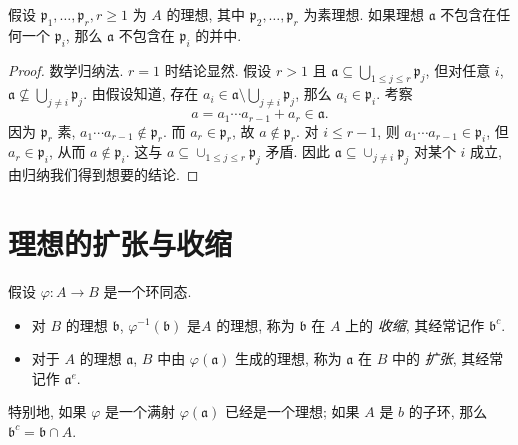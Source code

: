\begin{proposition}[素避]
  假设 \( \mathfrak{p}_1, \ldots, \mathfrak{p}_r, r \geq 1 \) 为 \( A \) 的理想,
  其中 \( \mathfrak{p}_2, \ldots, \mathfrak{p}_r \) 为素理想. 如果理想 \(
  \mathfrak{a} \) 不包含在任何一个 \( \mathfrak{p}_i \), 那么 \( \mathfrak{a} \)
  不包含在 \( \mathfrak{p}_i \) 的并中.
\end{proposition}
\begin{proof}
  数学归纳法. \( r = 1 \) 时结论显然. 假设 \( r > 1 \) 且 \( \mathfrak{a}
  \subseteq \bigcup_{1 \leq j \leq r} \mathfrak{p}_j \), 但对任意 \( i \), \(
  \mathfrak{a} \not\subseteq \bigcup_{j \neq i}\mathfrak{p}_j \). 由假设知道,
  存在 \( a_i \in \mathfrak{a} \setminus \bigcup_{j \neq i} \mathfrak{p}_j \),
  那么 \( a_i \in \mathfrak{p}_i \). 考察
  \[
    a = a_1 \cdots a_{r - 1} + a_r \in \mathfrak{a}.
  \]
  因为 \( \mathfrak{p}_r \) 素, \( a_1 \cdots a_{r - 1} \notin \mathfrak{p}_r
  \). 而 \( a_{r} \in \mathfrak{p}_r \), 故 \( a \notin \mathfrak{p}_r \).
  对 \( i \leq r - 1 \), 则 \( a_1 \cdots a_{r - 1} \in \mathfrak{p}_{i} \), 但
  \( a_r \in \mathfrak{p}_i \), 从而 \( a \notin \mathfrak{p}_i \). 这与 \( a
  \subseteq \cup_{1 \leq j \leq r} \mathfrak{p}_j \) 矛盾. 因此 \( \mathfrak{a}
  \subseteq \cup_{j \neq i} \mathfrak{p}_j \) 对某个 \( i \) 成立,
  由归纳我们得到想要的结论.
\end{proof}

\section{理想的扩张与收缩}

假设 \( \varphi: A \to B \) 是一个环同态.
\begin{itemize}
  \item 对 \( B \) 的理想 \( \mathfrak{b} \), \( \varphi^{-1}(\mathfrak{b}) \)
    是\( A \) 的理想, 称为 \( \mathfrak{b} \) 在 \( A\) 上的 \emph{收缩},
    其经常记作 \( \mathfrak{b}^{c} \).
  \item 对于 \( A \) 的理想 \( \mathfrak{a} \), \( B \) 中由 \(
    \varphi(\mathfrak{a}) \) 生成的理想, 称为 \( \mathfrak{a} \) 在 \( B \) 中的
    \emph{扩张}, 其经常记作 \( \mathfrak{a}^{e} \).
\end{itemize}
特别地, 如果 \( \varphi \) 是一个满射 \( \varphi(\mathfrak{a}) \)
已经是一个理想; 如果 \( A \) 是 \( b \) 的子环, 那么 \( \mathfrak{b}^{c} =
\mathfrak{b} \cap A \).

